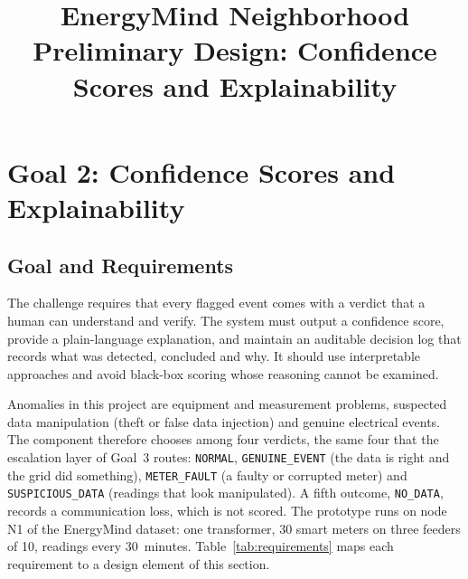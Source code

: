 \documentclass[11pt,a4paper]{article}
\title{EnergyMind Neighborhood\\[2pt]\large Preliminary Design: Confidence Scores and Explainability}
\author{}
\date{}
\begin{document}
\maketitle

\providecommand{\GE}{\texttt{GENUINE\_EVENT}}
\providecommand{\MF}{\texttt{METER\_FAULT}}
\providecommand{\SD}{\texttt{SUSPICIOUS\_DATA}}
\providecommand{\ND}{\texttt{NO\_DATA}}
\providecommand{\NORM}{\texttt{NORMAL}}

\section{Goal 2: Confidence Scores and Explainability}
\label{sec:goal2}

\subsection{Goal and Requirements}
The challenge requires that every flagged event comes with a verdict that a human can understand and
verify. The system must output a confidence score, provide a plain-language explanation, and maintain an
auditable decision log that records what was detected, concluded and why. It should use interpretable
approaches and avoid black-box scoring whose reasoning cannot be examined.

Anomalies in this project are equipment and measurement problems, suspected data manipulation (theft or
false data injection) and genuine electrical events. The component therefore chooses among four verdicts,
the same four that the escalation layer of Goal~3 routes: \NORM, \GE{} (the data is right and the grid did
something), \MF{} (a faulty or corrupted meter) and \SD{} (readings that look manipulated). A fifth outcome,
\ND, records a communication loss, which is not scored. The prototype runs on node N1 of the EnergyMind
dataset: one transformer, 30 smart meters on three feeders of 10, readings every 30~minutes.
Table~\ref{tab:requirements} maps each requirement to a design element of this section.
\end{document}
